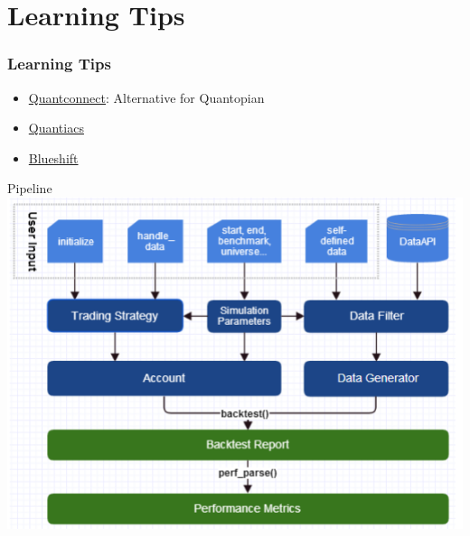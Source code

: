 \documentclass[aspectratio=169,11pt]{beamer}
\begin{document}
    \section{Learning Tips}
    \begin{frame}
        \frametitle{Learning Tips}
        \begin{itemize}
            \item \href{https://www.quantconnect.com/}{Quantconnect}: Alternative for Quantopian
            \item \href{https://quantiacs.com/}{Quantiacs}
            \item \href{https://blueshift.quantinsti.com/}{Blueshift}
        \end{itemize}
    \end{frame}

    \begin{frame}{Pipeline}
        \centering
        \includegraphics[width=0.6\linewidth]{quant_pipline.png}
    \end{frame}
\end{document}
